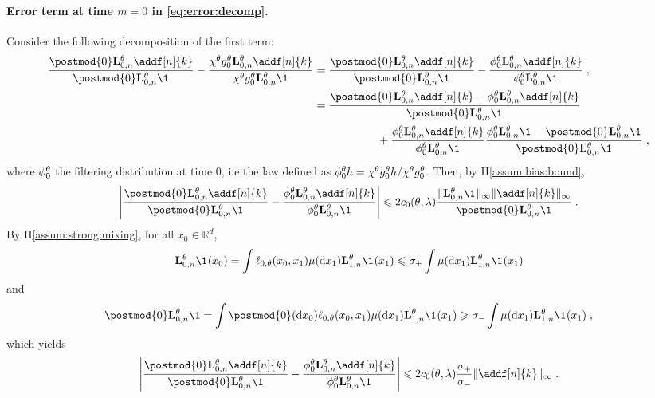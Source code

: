 \documentclass{article}
\begin{document}
\paragraph{Error term at time $m=0$ in \eqref{eq:error:decomp}. }Consider the following decomposition of the first term:
\begin{align*}
\frac{\postmod{0} \uk{0, n}{\parvec} \addf[n]{k}}{\postmod{0} \uk{0, n}{\parvec} \1_{}} - \frac{\chi^\parvec \md{0}{\parvec}\uk{0, n}{\parvec} \addf[n]{k}}{\chi^\parvec\md{0}{\parvec}\uk{0, n}{\parvec} \1_{}} &= \frac{\postmod{0} \uk{0, n}{\parvec} \addf[n]{k}}{\postmod{0} \uk{0, n}{\parvec} \1_{}} - \frac{\phi^\parvec_0\uk{0, n}{\parvec} \addf[n]{k}}{\phi^\parvec_0\uk{0, n}{\parvec} \1_{}}\eqsp,\\
& = \frac{\postmod{0} \uk{0, n}{\parvec} \addf[n]{k}-\phi^\parvec_0\uk{0, n}{\parvec} \addf[n]{k}}{\postmod{0} \uk{0, n}{\parvec} \1_{}} \\
&\hspace{2cm}+  \frac{\phi^\parvec_0\uk{0, n}{\parvec} \addf[n]{k}}{\phi^\parvec_0\uk{0, n}{\parvec} \1_{}}\frac{\phi^\parvec_0\uk{0, n}{\parvec} \1_{} - \postmod{0} \uk{0, n}{\parvec} \1_{}}{\postmod{0} \uk{0, n}{\parvec} \1_{}} \eqsp,
\end{align*}
where $\phi^\theta_0$ the filtering distribution at time $0$, i.e the law defined as  $\phi^\theta_0h= \chi^\theta g_{0}^{\theta}h/\chi^\theta g_{0}^{\theta}$. Then, by H\ref{assum:bias:bound},
$$
\left|\frac{\postmod{0} \uk{0, n}{\parvec} \addf[n]{k}}{\postmod{0} \uk{0, n}{\parvec} \1_{}} - \frac{\phi^\parvec_0\uk{0, n}{\parvec} \addf[n]{k}}{\phi^\parvec_0\uk{0, n}{\parvec} \1_{}}\right|\leqslant 2c_0(\parvec,\parvar)\frac{\| \uk{0, n}{\parvec} \1_{}\|_\infty\|\addf[n]{k}\|_\infty}{\postmod{0} \uk{0, n}{\parvec} \1_{}}\eqsp.
$$
By H\ref{assum:strong:mixing}, for all $x_0\in \mathbb{R}^d$,
$$
\uk{0, n}{\parvec} \1_{}(x_0) = \int  \ud{0,\parvec}(x_0, x_{1})\mu(\rmd x_1)\uk{1, n}{\parvec} \1_{}(x_1)\leqslant \sigma_+  \int \mu(\rmd x_1)\uk{1, n}{\parvec} \1_{}(x_1)
$$
and 
$$
\postmod{0} \uk{0, n}{\parvec} \1 = \int \postmod{0} (\rmd x_0)\ud{0,\parvec}(x_0, x_{1})\mu(\rmd x_1)\uk{1, n}{\parvec} \1_{}(x_1)\geqslant \sigma_-  \int \mu(\rmd x_1)\uk{1, n}{\parvec} \1_{}(x_1)\eqsp,
$$
which yields
$$
\left|\frac{\postmod{0} \uk{0, n}{\parvec} \addf[n]{k}}{\postmod{0} \uk{0, n}{\parvec} \1_{}} - \frac{\phi^\parvec_0\uk{0, n}{\parvec} \addf[n]{k}}{\phi^\parvec_0\uk{0, n}{\parvec} \1_{}}\right|\leqslant 2c_0(\parvec,\parvar)\frac{\sigma_+}{\sigma_-}\|\addf[n]{k}\|_\infty\eqsp.
$$
\end{document}
